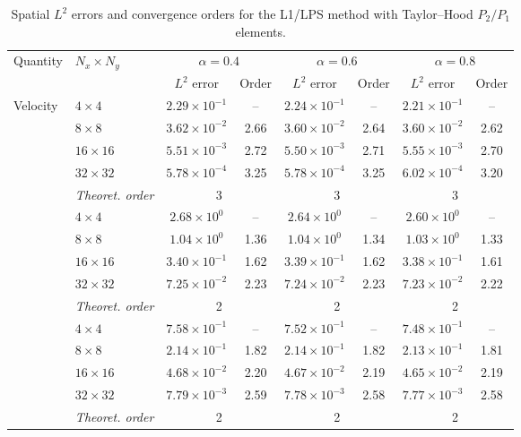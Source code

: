 \documentclass[11pt,a4paper]{article}
\numberwithin{equation}{section}
\renewcommand{\arraystretch}{1.25}
\theoremstyle{plain}
\theoremstyle{definition}
\theoremstyle{remark}
\begin{document}
\begin{table}[htbp]
\centering
\caption{Spatial $L^2$ errors and convergence orders for the L1/LPS
method with Taylor--Hood $P_2/P_1$ elements.}
\label{tab:ex1-space-lps}
\setlength{\tabcolsep}{6pt}
\renewcommand{\arraystretch}{1.15}
\begin{tabular}{llcc|cc|cc}
\toprule
\multirow{2}{*}{Quantity} & \multirow{2}{*}{$N_x\times N_y$}
& \multicolumn{2}{c|}{$\alpha=0.4$}
& \multicolumn{2}{c|}{$\alpha=0.6$}
& \multicolumn{2}{c}{$\alpha=0.8$} \\
\cmidrule(lr){3-4}
\cmidrule(lr){5-6}
\cmidrule(l){7-8}
& & $L^2$ error & Order
  & $L^2$ error & Order
  & $L^2$ error & Order \\
\midrule

\multirow{5}{*}{Velocity}
& $4\times4$   & $2.29\times10^{-1}$ & --   & $2.24\times10^{-1}$ & --   & $2.21\times10^{-1}$ & --   \\
& $8\times8$   & $3.62\times10^{-2}$ & 2.66 & $3.60\times10^{-2}$ & 2.64 & $3.60\times10^{-2}$ & 2.62 \\
& $16\times16$ & $5.51\times10^{-3}$ & 2.72 & $5.50\times10^{-3}$ & 2.71 & $5.55\times10^{-3}$ & 2.70 \\
& $32\times32$ & $5.78\times10^{-4}$ & 3.25 & $5.78\times10^{-4}$ & 3.25 & $6.02\times10^{-4}$ & 3.20 \\
& \textit{Theoret. order}
& \multicolumn{2}{c|}{3}
& \multicolumn{2}{c|}{3}
& \multicolumn{2}{c}{3} \\

\addlinespace
\multirow{5}{*}{Stress}
& $4\times4$   & $2.68\times10^{0}$  & --   & $2.64\times10^{0}$  & --   & $2.60\times10^{0}$  & --   \\
& $8\times8$   & $1.04\times10^{0}$  & 1.36 & $1.04\times10^{0}$  & 1.34 & $1.03\times10^{0}$  & 1.33 \\
& $16\times16$ & $3.40\times10^{-1}$ & 1.62 & $3.39\times10^{-1}$ & 1.62 & $3.38\times10^{-1}$ & 1.61 \\
& $32\times32$ & $7.25\times10^{-2}$ & 2.23 & $7.24\times10^{-2}$ & 2.23 & $7.23\times10^{-2}$ & 2.22 \\
& \textit{Theoret. order}
& \multicolumn{2}{c|}{2}
& \multicolumn{2}{c|}{2}
& \multicolumn{2}{c}{2} \\

\addlinespace
\multirow{5}{*}{Energy norm}
& $4\times4$   & $7.58\times10^{-1}$ & --   & $7.52\times10^{-1}$ & --   & $7.48\times10^{-1}$ & --   \\
& $8\times8$   & $2.14\times10^{-1}$ & 1.82 & $2.14\times10^{-1}$ & 1.82 & $2.13\times10^{-1}$ & 1.81 \\
& $16\times16$ & $4.68\times10^{-2}$ & 2.20 & $4.67\times10^{-2}$ & 2.19 & $4.65\times10^{-2}$ & 2.19 \\
& $32\times32$ & $7.79\times10^{-3}$ & 2.59 & $7.78\times10^{-3}$ & 2.58 & $7.77\times10^{-3}$ & 2.58 \\
& \textit{Theoret. order}
& \multicolumn{2}{c|}{2}
& \multicolumn{2}{c|}{2}
& \multicolumn{2}{c}{2} \\


\end{tabular}
\end{table}
\end{document}
